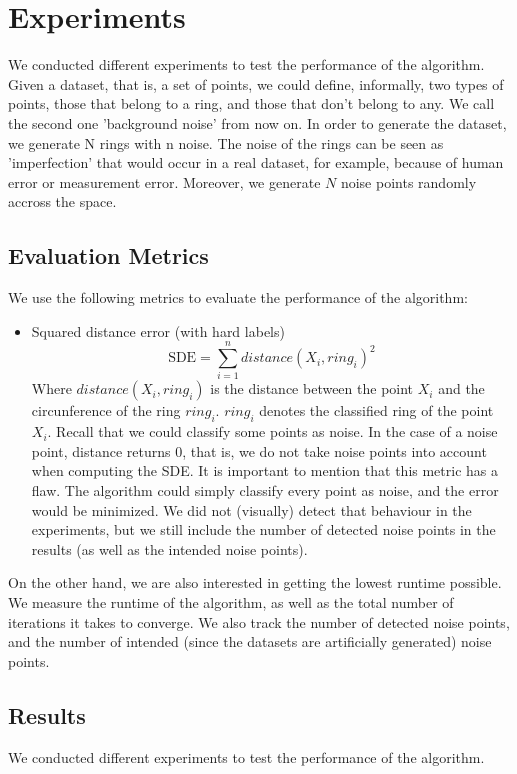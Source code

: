 \documentclass[conference]{IEEEtran}
\begin{document}
\section{Experiments}
We conducted different experiments to test the performance of the algorithm. Given a dataset, that is, a set of points, we could define, informally,
two types of points, those that belong to a ring, and those that don't belong to any. We call the second one 'background noise' from now on.
In order to generate the dataset, we generate N rings with n noise. The noise of the rings can be seen as 'imperfection' that would occur in a real dataset,
for example, because of human error or measurement error.
Moreover, we generate $N$ noise points randomly accross the space.
\subsection{Evaluation Metrics}
We use the following metrics to evaluate the performance of the algorithm:
\begin{itemize}
    \item Squared distance error (with hard labels)
    \begin{equation}
        \text{SDE} = \sum_{i=1}^{n} distance(X_i, ring_i)^2
    \end{equation}
    Where $distance(X_i, ring_i)$ is the distance between the point $X_i$ and the circunference of the ring $ring_i$.
    $ring_i$ denotes the classified ring of the point $X_i$.
    Recall that we could classify some points as noise. In the case of a noise point, distance returns 0, that is,
    we do not take noise points into account when computing the SDE.
    It is important to mention that this metric has a flaw. The algorithm could simply classify every point as noise, and the error would be minimized.
    We did not (visually) detect that behaviour in the experiments, but we still include the number of detected noise points in the results (as well as the intended noise points).
\end{itemize}
On the other hand, we are also interested in getting the lowest runtime possible. We measure the runtime of the algorithm, as well as the total number of iterations it takes to converge.
We also track the number of detected noise points, and the number of intended (since the datasets are artificially generated) noise points.
\subsection{Results}
We conducted different experiments to test the performance of the algorithm.
\end{document}
